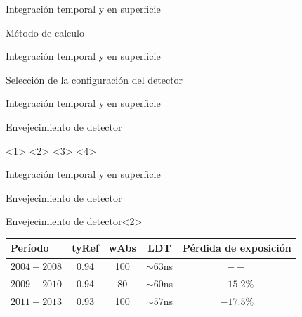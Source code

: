 \begin{frame}{Integraci\'on temporal y en superficie}
	\begin{block}{M\'etodo de calculo}
		\begin{center}
		\end{center}
	\end{block}
\end{frame}

\begin{frame}{Integraci\'on temporal y en superficie}
	\begin{block}{Selecci\'on de la configuraci\'on del detector}
		\begin{center}
		\end{center}
	\end{block}
\end{frame}


\begin{frame}{Integraci\'on temporal y en superficie}
	\begin{block}{Envejecimiento de detector}
		\begin{center}
		<1>
		<2>
		<3>
		<4>
		\end{center}
	\end{block}
\end{frame}


\begin{frame}{Integraci\'on temporal y en superficie}
	\begin{block}{Envejecimiento de detector}
		\begin{center}
		\end{center}
	\end{block}
	\begin{block}{Envejecimiento de detector}<2>
		\begin{center}
		\renewcommand{\arraystretch}{1.4}
		\footnotesize
		\begin{tabular}{|l|ccc|c|}
					\hline
					Período       & tyRef & wAbs & LDT        &    Pérdida de exposición \\
					\hline
					$2004 - 2008$ & 0.94  & 100  & $\sim63$ns &    $--$ \\
					$2009 - 2010$ & 0.94  & 80   & $\sim60$ns &    $-15.2\%$\\
					$2011 - 2013$ & 0.93  & 100  & $\sim57$ns &    $-17.5\%$\\
					\hline
		\end{tabular}
		\end{center}
	\end{block}
\end{frame}

